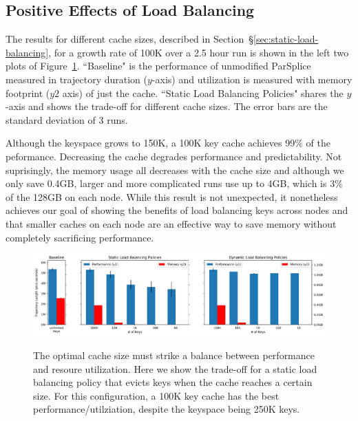 \subsection{Positive Effects of Load Balancing}
\label{sec:positive-effects-of-load-balancing}

The results for different cache sizes, described in
Section~\S\ref{sec:static-load-balancing}, for a growth rate of 100K over a 2.5
hour run is shown in the left two plots of
Figure~\ref{fig:methodology-tradeoff}.  ``Baseline" is the performance of
unmodified ParSplice  measured in trajectory duration (\(y\)-axis) and
utilization is measured with memory footprint (\(y2\) axis) of just the cache.
``Static Load Balancing Policies" shares the \(y\)-axis and shows the trade-off
for different cache sizes. The error bars are the standard deviation of 3 runs. 

Although the keyspace grows to 150K, a 100K key cache achieves 99\% of the
peformance. Decreasing the cache degrades performance and predictability.  Not
suprisingly, the memory usage all decreases with the cache size and although we
only save 0.4GB, larger and more complicated runs use up to 4GB, which is 3\%
of the 128GB on each node.  While this result is not unexpected, it nonetheless
achieves our goal of showing the benefits of load balancing keys across nodes
and that smaller caches on each node are an effective way to save memory
without completely sacrificing performance.

\begin{figure}[tbh]
  \noindent\includegraphics[width=1\textwidth]{figures/methodology-tradeoff.png}\\
  \caption{The optimal cache size must strike a balance between performance and
  resoure utilization. Here we show the trade-off for a static load balancing
  policy that evicts keys when the cache reaches a certain size. For this
  configuration, a 100K key cache has the best performance/utilziation, despite
  the keyspace being 250K keys. \label{fig:methodology-tradeoff}}
\end{figure}

